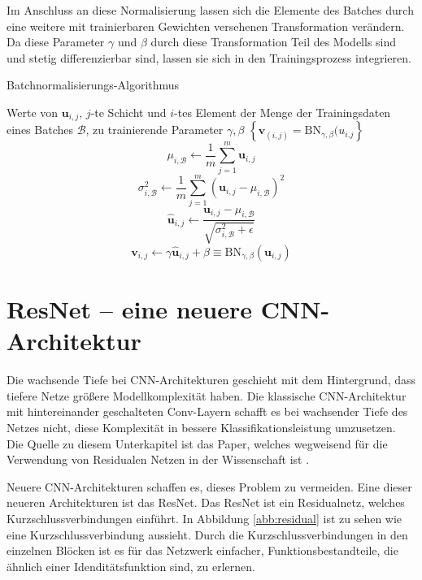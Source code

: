 Im Anschluss an diese Normalisierung lassen sich die Elemente des Batches durch eine weitere mit trainierbaren Gewichten versehenen Transformation verändern. Da diese Parameter $\gamma$ und $\beta$ durch diese Transformation Teil des Modells sind und stetig differenzierbar sind, lassen sie sich in den Trainingsprozess integrieren.

\renewcommand{\algorithmicrequire}{\textbf{Eingabe:}}
\renewcommand{\algorithmicensure}{\textbf{Ausgabe:}}


\begin{algorithm}[H]
\caption{Batchnormalisierungs-Algorithmus}
\begin{algorithmic}
\REQUIRE Werte von $\mathbf{u}_{i,j}$, $j$-te  Schicht und $i$-tes Element der Menge der Trainingsdaten  eines Batches $\mathcal{B}$, zu trainierende Parameter $\gamma, \beta$
\ENSURE $\left\{ \mathbf{v}_{(i,j)} =\text{BN}_{\gamma, \beta}(u_{i.j} \right\} $
\STATE $$\mu_{i,\mathcal{B}} \leftarrow \frac{1}{m}\sum_{j=1}^{m} \mathbf{u}_{i,j}$$
\STATE $$\sigma^2_{i,\mathcal{B}} \leftarrow \frac{1}{m} \sum_{j=1}^m \left( \mathbf{u}_{i,j} -\mu_{i,\mathcal{B}}\right)^2$$
\STATE $$ \hat{\mathbf{u}}_{i,j} \leftarrow \frac{\mathbf{u}_{i,j}-\mu_{i,\mathcal{B}}}{\sqrt{\sigma_{i,\mathcal{B}}^2+\epsilon}}$$
\STATE $$\mathbf{v}_{i,j} \leftarrow \gamma \hat{\mathbf{u}}_{i,j} + \beta  \equiv \text{BN}_{\gamma,\beta}(\mathbf{u}_{i,j})$$
\end{algorithmic}
\label{alg:bn}
\end{algorithm}


\color{black}


\section{ResNet -- eine neuere CNN-Architektur}\label{sec:res}
Die wachsende Tiefe bei CNN-Architekturen geschieht mit dem Hintergrund, dass tiefere Netze größere Modellkomplexität haben. Die klassische CNN-Architektur mit hintereinander geschalteten Conv-Layern schafft es bei wachsender Tiefe des Netzes nicht, diese Komplexität in bessere Klassifikationsleistung umzusetzen. Die Quelle zu diesem Unterkapitel ist das Paper, welches wegweisend für die Verwendung von Residualen Netzen in der Wissenschaft ist \cite{resnet}.


Neuere CNN-Architekturen schaffen es, dieses Problem zu vermeiden. Eine dieser neueren Architekturen ist das ResNet. Das ResNet ist ein Residualnetz, welches Kurzschlussverbindungen einführt. In Abbildung \ref{abb:residual} ist zu sehen wie eine Kurzschlussverbindung aussieht. Durch die Kurzschlussverbindungen in den einzelnen Blöcken ist es für das Netzwerk einfacher, Funktionsbestandteile, die ähnlich einer Idenditätsfunktion sind, zu erlernen.   

